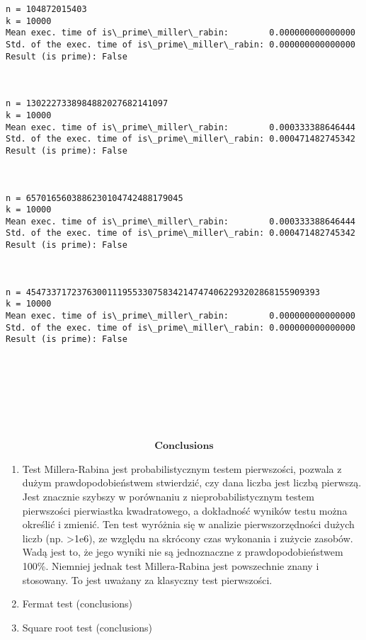 \documentclass[11pt]{article}
\makeatletter
\newcommand{\boxspacing}{\kern\kvtcb@left@rule\kern\kvtcb@boxsep}
\newcommand{\prompt}[4]{
        {\ttfamily\llap{{\color{#2}[#3]:\hspace{3pt}#4}}\vspace{-\baselineskip}}
    }
\makeatother
\begin{document}
\begin{Verbatim}[commandchars=\\\{\}]
n = 104872015403
k = 10000
Mean exec. time of is\_prime\_miller\_rabin:        0.000000000000000
Std. of the exec. time of is\_prime\_miller\_rabin: 0.000000000000000
Result (is prime): False



n = 1302227338984882027682141097
k = 10000
Mean exec. time of is\_prime\_miller\_rabin:        0.000333388646444
Std. of the exec. time of is\_prime\_miller\_rabin: 0.000471482745342
Result (is prime): False



n = 6570165603886230104742488179045
k = 10000
Mean exec. time of is\_prime\_miller\_rabin:        0.000333388646444
Std. of the exec. time of is\_prime\_miller\_rabin: 0.000471482745342
Result (is prime): False



n = 4547337172376300111955330758342147474062293202868155909393
k = 10000
Mean exec. time of is\_prime\_miller\_rabin:        0.000000000000000
Std. of the exec. time of is\_prime\_miller\_rabin: 0.000000000000000
Result (is prime): False








    \end{Verbatim}

    \hypertarget{textbfconclusions}{%
\paragraph{\texorpdfstring{\[\textbf{Conclusions}\]}{\textbackslash textbf\{Conclusions\}}}\label{textbfconclusions}}

\begin{enumerate}
\def\labelenumi{\arabic{enumi}.}
\item
  Test Millera-Rabina jest probabilistycznym testem pierwszości, pozwala
  z dużym prawdopodobieństwem stwierdzić, czy dana liczba jest liczbą
  pierwszą. Jest znacznie szybszy w porównaniu z nieprobabilistycznym
  testem pierwszości pierwiastka kwadratowego, a dokładność wyników
  testu można określić i zmienić. Ten test wyróżnia się w analizie
  pierwszorzędności dużych liczb (np. \textgreater1e6), ze względu na
  skrócony czas wykonania i zużycie zasobów. Wadą jest to, że jego
  wyniki nie są jednoznaczne z prawdopodobieństwem 100\%. Niemniej
  jednak test Millera-Rabina jest powszechnie znany i stosowany. To jest
  uważany za klasyczny test pierwszości.
\item
  Fermat test (conclusions)
\item
  Square root test (conclusions)
\end{enumerate}

    \begin{tcolorbox}[breakable, size=fbox, boxrule=1pt, pad at break*=1mm,colback=cellbackground, colframe=cellborder]
\prompt{In}{incolor}{ }{\boxspacing}
\begin{Verbatim}[commandchars=\\\{\}]

\end{Verbatim}
\end{tcolorbox}


    
    
    
\end{document}
